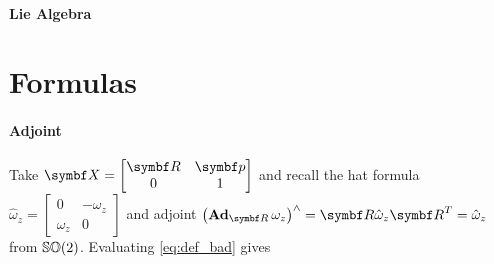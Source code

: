 \paragraph{Lie Algebra}


\section{Formulas}

\paragraph{Adjoint}

Take $\X = \begin{bmatrix} \bR & \bp \\ 0 & 1 \end{bmatrix}$ and recall the hat formula $\hat \omega_{z} = \begin{bmatrix} 0 & -\omega_{z} \\ \omega_{z} & 0 \end{bmatrix}$ and adjoint $\left(\bAd_{\bR} \omega_{z} \right)^{\wedge} = \bR \hat \omega_{z} \bR^{T} = \hat \omega_{z}$ from ${\mathbb{SO}(2)}$. Evaluating \eqref{eq:def_bad} gives
